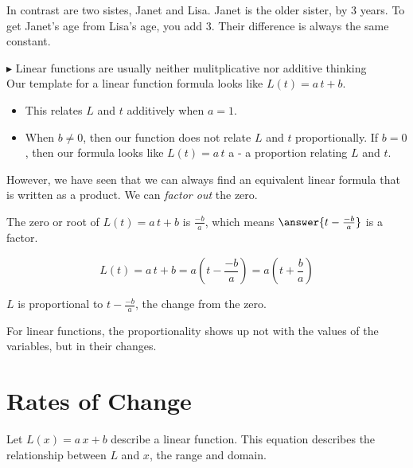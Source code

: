 \documentclass{ximera}
\begin{document}
In contrast are two sistes, Janet and Lisa. Janet is the older sister, by $3$ years. To get Janet's age from Lisa's age, you add $3$.  Their difference is always the same constant.






$\blacktriangleright$ Linear functions are usually neither mulitplicative nor additive thinking \\




Our template for a linear function formula looks like $L(t) = a \, t + b$. \\



\begin{itemize}

\item This relates $L$ and $t$ additively when $a = 1$.

\item When $b \ne 0$, then our function does not relate $L$ and $t$ proportionally.  If $b = 0$, then our formula looks like $L(t) = a \, t$ a - a proportion relating $L$ and $t$.


\end{itemize}


However, we have seen that we can always find an equivalent linear formula that is written as a product.  We can \textit{factor out} the zero.




The zero or root of $L(t) = a \, t + b$ is $\frac{-b}{a}$, which means $\answer{t - \frac{-b}{a}}$ is a factor.




\[
L(t) = a \, t + b = a \left( t -  \frac{-b}{a} \right) =  a \left( t + \frac{b}{a} \right)
\]



$L$ is proportional to $t -  \frac{-b}{a}$, the change from the zero.


For linear functions, the proportionality shows up not with the values of the variables, but in their changes.





\section{Rates of Change}




Let $L(x) = a \, x + b$ describe a linear function.   This equation describes the relationship between $L$ and $x$, the range and domain.
\end{document}
